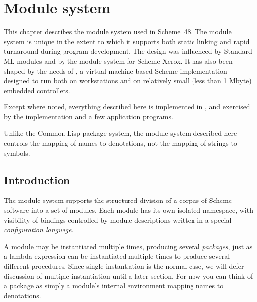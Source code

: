
%
%
%
%

\chapter{Module system}
\label{chapter:modules}

This chapter describes the module system used in Scheme~48.
The module system is unique in the extent to which it
supports both static linking and rapid turnaround during program
development.  The design was influenced by Standard ML
modules\cite{MacQueen:Modules} and by the module system for Scheme
Xerox\cite{Curtis-Rauen:Modules}.  It has also been shaped by the
needs of \hack{}, a virtual-machine-based Scheme implementation
designed to run both on workstations and on relatively small (less
than 1 Mbyte) embedded controllers.

Except where noted, everything described here is implemented in
\hack{}, and exercised by the \hack{} implementation and a few
application programs.

Unlike the Common Lisp package system, the module system described
here controls the mapping of names to denotations, not the
mapping of strings to symbols.


\section{Introduction}

The module system supports the structured division of a corpus of
Scheme software into a set of modules.  Each module has its own
isolated namespace, with visibility of bindings controlled by module
descriptions written in a special {\em configuration language.}

A module may be instantiated multiple times, producing several {\em
packages}, just as a lambda-expression can be instantiated multiple
times to produce several different procedures.  Since single
instantiation is the normal case, we will defer discussion of multiple
instantiation until a later section.  For now you can think of a
package as simply a module's internal environment mapping names to
denotations.


